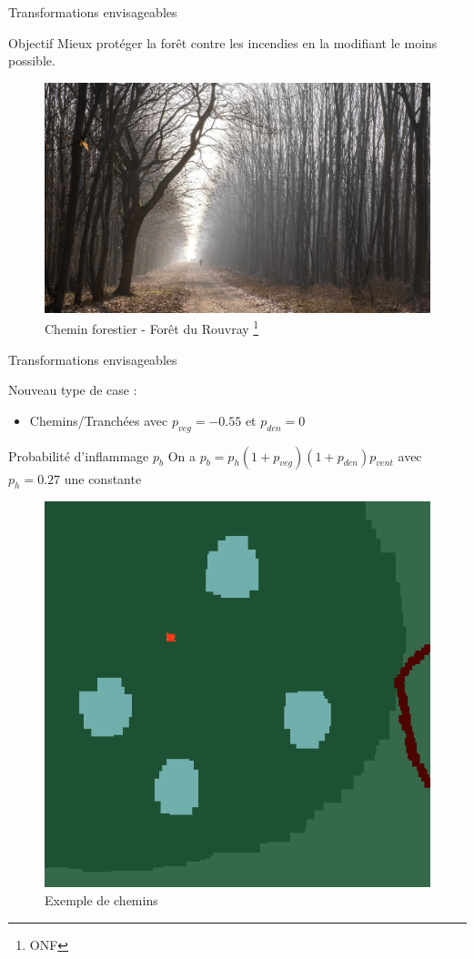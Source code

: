 \documentclass{beamer}
\begin{document}
\begin{frame}{Transformations envisageables \hyperlink{jump}{\beamerbutton{ }} \hypertarget{11}{\beamerbutton{ }}}
    \begin{block}{Objectif}
        Mieux protéger la forêt contre les incendies en la modifiant le moins possible.
    \end{block}

    \begin{figure}
        \centering
        \includegraphics[width=0.75\linewidth]{pictures/chemin.jpeg}
        \caption{Chemin forestier - Forêt du Rouvray \footnote{ONF}}
        \label{fig:enter-label}
    \end{figure}
\end{frame}

\begin{frame}{Transformations envisageables \hyperlink{jump}{\beamerbutton{ }} \hypertarget{12}{\beamerbutton{ }}}
    \begin{block}{Nouveau type de case :}
        \begin{itemize}
            \item Chemins/Tranchées avec $p_{veg} = -0.55$ et $p_{den} = 0$
        \end{itemize}
    \end{block}

    \begin{block}{Probabilité d'inflammage $p_b$}
        On a $p_b = p_h (1 + p_{veg}) (1 + p_{den}) p_{vent}$ avec $p_h = 0.27$ une constante
    \end{block}

    \begin{figure}
        \centering
        \includegraphics[width=.3\linewidth]{pictures/model1/land_before.png}
        \caption{Exemple de chemins}\label{Fig:Data1}
        \label{fig:enter-label}
    \end{figure}
\end{frame}
\end{document}
